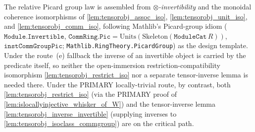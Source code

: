 The relative Picard group law is assembled from \emph{\(\otimes\)-invertibility}
and the monoidal coherence isomorphisms of
\cref{lem:tensorobj_assoc_iso}, \cref{lem:tensorobj_unit_iso}, and
\cref{lem:tensorobj_comm_iso},
following Mathlib's Picard-group idiom (\(\mathtt{Module.Invertible}\),
\(\mathtt{CommRing.Pic} = \mathrm{Units}(\mathrm{Skeleton}(\mathtt{ModuleCat}\,R))\),
\(\mathtt{instCommGroupPic}\); \texttt{Mathlib.RingTheory.PicardGroup}) as the
design template. Under the route~(e) fallback the inverse of an invertible object
is carried by the predicate itself, so neither the open-immersion
restriction-compatibility isomorphism \cref{lem:tensorobj_restrict_iso} nor a
separate tensor-inverse lemma is needed there. Under the PRIMARY locally-trivial
route, by contrast, both \cref{lem:tensorobj_restrict_iso} (via the PRIMARY proof
of \cref{lem:islocallyinjective_whisker_of_W}) and the tensor-inverse lemma
\cref{lem:tensorobj_inverse_invertible} (supplying inverses to
\cref{lem:tensorobj_isoclass_commgroup}) are on the critical path.

